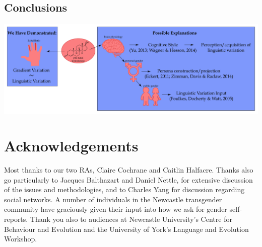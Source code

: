 \documentclass[a0,portrait]{a0poster}
\begin{document}
\begin{multicols}{2}

\color{SaddleBrown} %

\section*{Conclusions}


\color{DarkSlateGray} %



\includegraphics[width = 1\linewidth]{figures/possible_causes.pdf}

\end{multicols}

\clearpage


\section*{Acknowledgements}

Most thanks to our two RAs, Claire Cochrane and Caitlin Halfacre. Thanks also go particularly to Jacques Balthazart and Daniel Nettle, for extensive discussion of the issues and methodologies, and to Charles Yang for discussion regarding social networks. A number of individuals in the Newcastle transgender community have graciously given their input into how we ask for gender self-reports. Thank you also to audiences at Newcastle University's Centre for Behaviour and Evolution and the University of York's Language and Evolution Workshop.

\end{document}
